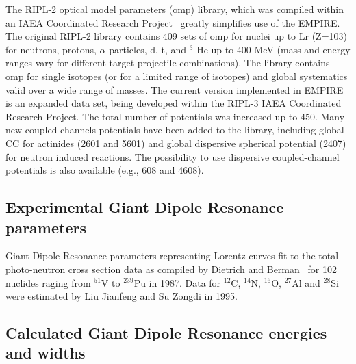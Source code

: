 The RIPL-2 optical model parameters (omp) library, which was compiled within
an IAEA Coordinated Research Project~\cite{RIPL2} greatly simplifies use of
the EMPIRE. The original RIPL-2 library contains 409 sets of omp for nuclei
up to Lr (Z=103) for neutrons, protons, $\alpha$-particles, d, t, and $^{3}$%
He up to 400 MeV (mass and energy ranges vary for different
target-projectile combinations). The library contains omp for single
isotopes (or for a limited range of isotopes) and global systematics valid
over a wide range of masses. The current version implemented in EMPIRE is an
expanded data set, being developed within the RIPL-3 IAEA Coordinated
Research Project. The total number of potentials was increased up to 450.
Many new coupled-channels potentials have been added to the library,
including global CC for actinides (2601 and 5601) and global dispersive
spherical potential (2407) for neutron induced reactions. The possibility to
use dispersive coupled-channel potentials is also available (e.g., 608 and
4608).

\subsection{Experimental Giant Dipole Resonance parameters}

Giant Dipole Resonance parameters representing Lorentz curves fit to the
total photo-neutron cross section data as compiled by Dietrich and Berman~%
\cite{die88} for 102 nuclides raging from $^{51}$V to $^{239}$Pu in 1987.
Data for $^{12}$C, $^{14}$N, $^{16}$O, $^{27}$Al and $^{28}$Si were
estimated by Liu Jianfeng and Su Zongdi in 1995.

\subsection{Calculated Giant Dipole Resonance energies and widths}

